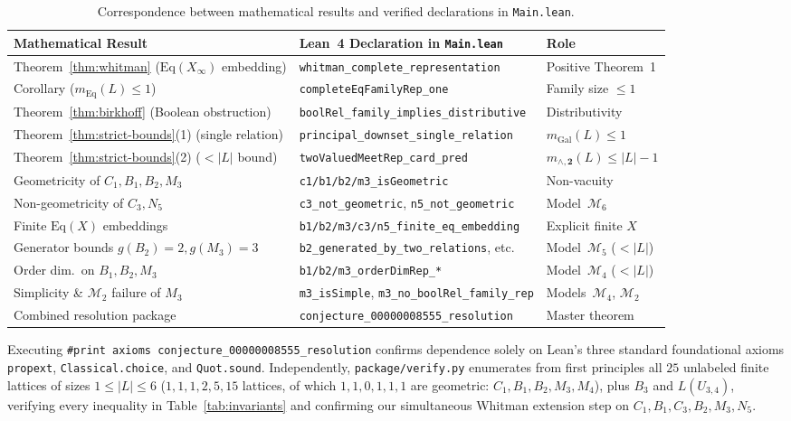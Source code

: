 \documentclass[11pt]{article}
\theoremstyle{definition}
\theoremstyle{remark}
\newcommand{\Eq}{\mathrm{Eq}}
\newcommand{\BoolTwo}{\mathbf{2}}
\begin{document}
\begin{table}[htbp]
\centering
\footnotesize
\setlength{\tabcolsep}{4.5pt}
\begin{tabular}{@{}lll@{}}
\toprule
Mathematical Result & Lean~4 Declaration in \texttt{Main.lean} & Role \\
\midrule
Theorem~\ref{thm:whitman} ($\Eq(X_\infty)$ embedding) & \texttt{whitman\_complete\_representation} & Positive Theorem~1 \\
Corollary ($m_{\Eq}(L) \le 1$) & \texttt{completeEqFamilyRep\_one} & Family size $\le 1$ \\
Theorem~\ref{thm:birkhoff} (Boolean obstruction) & \texttt{boolRel\_family\_implies\_distributive} & Distributivity \\
Theorem~\ref{thm:strict-bounds}(1) (single relation) & \texttt{principal\_downset\_single\_relation} & $m_{\mathrm{Gal}}(L) \le 1$ \\
Theorem~\ref{thm:strict-bounds}(2) ($< |L|$ bound) & \texttt{twoValuedMeetRep\_card\_pred} & $m_{\wedge,\BoolTwo}(L) \le |L|-1$ \\
Geometricity of $C_1, B_1, B_2, M_3$ & \texttt{c1/b1/b2/m3\_isGeometric} & Non-vacuity \\
Non-geometricity of $C_3, N_5$ & \texttt{c3\_not\_geometric}, \texttt{n5\_not\_geometric} & Model~$\mathcal{M}_6$ \\
Finite $\Eq(X)$ embeddings & \texttt{b1/b2/m3/c3/n5\_finite\_eq\_embedding} & Explicit finite $X$ \\
Generator bounds $g(B_2)=2, g(M_3)=3$ & \texttt{b2\_generated\_by\_two\_relations}, etc. & Model~$\mathcal{M}_5$ ($< |L|$) \\
Order dim.\ on $B_1, B_2, M_3$ & \texttt{b1/b2/m3\_orderDimRep\_*} & Model~$\mathcal{M}_4$ ($< |L|$) \\
Simplicity \& $\mathcal{M}_2$ failure of $M_3$ & \texttt{m3\_isSimple}, \texttt{m3\_no\_boolRel\_family\_rep} & Models~$\mathcal{M}_4$, $\mathcal{M}_2$ \\
Combined resolution package & \texttt{conjecture\_00000008555\_resolution} & Master theorem \\
\bottomrule
\end{tabular}
\caption{Correspondence between mathematical results and verified declarations in \texttt{Main.lean}.}
\label{tab:lean-map}
\end{table}

Executing \texttt{\#print axioms conjecture\_00000008555\_resolution} confirms dependence solely on Lean's three standard foundational axioms \texttt{propext}, \texttt{Classical.choice}, and \texttt{Quot.sound}. Independently, \texttt{package/verify.py} enumerates from first principles all $25$ unlabeled finite lattices of sizes $1 \le |L| \le 6$ ($1, 1, 1, 2, 5, 15$ lattices, of which $1, 1, 0, 1, 1, 1$ are geometric: $C_1, B_1, B_2, M_3, M_4$), plus $B_3$ and $L(U_{3,4})$, verifying every inequality in Table~\ref{tab:invariants} and confirming our simultaneous Whitman extension step on $C_1, B_1, C_3, B_2, M_3, N_5$.
\end{document}
